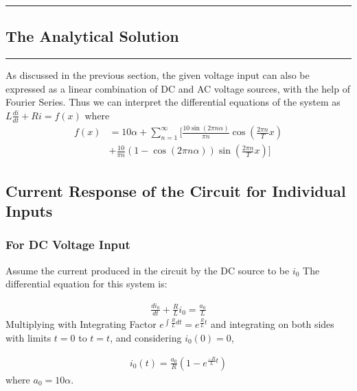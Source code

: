 \newpage
{\color{gray}\hrule}
\begin{center}
\section{The Analytical Solution}
\bigskip
\end{center}
{\color{gray}\hrule}
\begin{multicols}{2}

As discussed in the previous section, the given voltage input can also be expressed as a linear combination of DC and AC voltage sources, with the help of Fourier Series.
Thus we can interpret the differential equations of the system as
    $L\frac{di}{dt}+Ri=f(x)$
where
\begin{equation}
\begin{split}
f(x) &= 10\alpha + \sum_{n=1}^{\infty} \Bigg[ \frac{10 \sin (2 \pi n \alpha)}{\pi n} \cos\left(\frac{2\pi n}{T} x \right) \\
&+ \frac{10}{\pi n} (1 - \cos (2 \pi n \alpha)) \sin\left(\frac{2\pi n}{T} x \right) \Bigg]
\end{split}
\end{equation}

\subsection{Current Response of the Circuit for Individual Inputs}

\subsubsection{For DC Voltage Input}
Assume the current produced in the circuit by the DC source to be $i_0$
The differential equation for this system is:

\begin{align}
    \frac{di_0}{dt}+\frac{R}{L}i_0=\frac{a_0}{L}
\end{align}
Multiplying with Integrating Factor $e^{\int \frac{R}{L}dt}=e^{\frac{R}{L}t}$ and integrating on both sides with limits $t=0$ to $t=t$, and considering $i_0(0)=0$,

\begin{align}
    i_0(t)=\frac{a_0}{R} \left(1-e^{\frac{-R}{L}t} \right)
\end{align}
where $a_0=10\alpha$.


\end{multicols}
